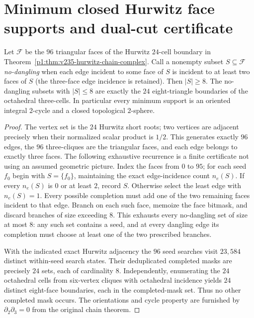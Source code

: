 \documentclass[11pt]{article}
\begin{document}
\section{Minimum closed Hurwitz face supports and dual-cut certificate}
\label{p1:sec:v356-hurwitz-minimal-faces}

\begin{theorem}
\label{p1:thm:v356-hurwitz-minimal-faces}
Let $\mathscr F$ be the $96$ triangular faces of the Hurwitz
$24$-cell boundary in Theorem~\ref{p1:thm:v235-hurwitz-chain-complex}.
Call a nonempty subset $S\subseteq\mathscr F$ \emph{no-dangling}
when each edge incident to some face of $S$ is incident to at least
two faces of $S$ (the three-face edge incidence is retained).
Then $|S|\geq 8$.  The no-dangling subsets with $|S|\leq 8$
are exactly the $24$ eight-triangle boundaries of the octahedral
three-cells.  In particular every minimum support is an oriented
integral $2$-cycle and a closed topological $2$-sphere.
\end{theorem}
\begin{proof}
The vertex set is the $24$ Hurwitz short roots; two vertices are
adjacent precisely when their normalized scalar product is $1/2$.
This generates exactly $96$ edges, the $96$ three-cliques are the
triangular faces, and each edge belongs to exactly three faces.
The following exhaustive recurrence is a finite certificate not using
an assumed geometric picture.  Index the faces from $0$ to $95$;
for each seed $f_0$ begin with $S=\{f_0\}$, maintaining the exact
edge-incidence count $n_e(S)$.  If every $n_e(S)$ is $0$ or at least
$2$, record $S$.  Otherwise select the least edge with $n_e(S)=1$.
Every possible completion must add one of the two remaining faces
incident to that edge.  Branch on each such face, memoize the face
bitmask, and discard branches of size exceeding $8$.  This
exhausts every no-dangling set of size at most $8$: any such set
contains a seed, and at every dangling edge its completion must
choose at least one of the two prescribed branches.

With the indicated exact Hurwitz adjacency the $96$ seed searches
visit $23{,}584$ distinct within-seed search states.  Their deduplicated
completed masks are precisely $24$ sets, each of cardinality $8$.
Independently, enumerating the $24$ octahedral cells from six-vertex
cliques with octahedral incidence yields $24$ distinct eight-face
boundaries, each in the completed-mask set.  Thus no other completed
mask occurs.  The orientations and cycle property are furnished by
$\partial_2\partial_3=0$ from the original chain theorem.
\end{proof}
\end{document}
